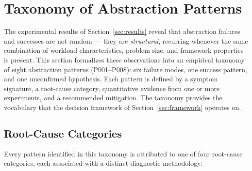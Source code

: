 
\section{Taxonomy of Abstraction Patterns}
\label{sec:taxonomy}

The experimental results of Section~\ref{sec:results} reveal that abstraction
failures and successes are not random --- they are \emph{structural}, recurring
whenever the same combination of workload characteristics, problem size, and
framework properties is present. This section formalizes these observations into
an empirical taxonomy of eight abstraction patterns (P001--P008): six failure
modes, one success pattern, and one unconfirmed hypothesis. Each pattern is
defined by a symptom signature, a root-cause category, quantitative evidence
from one or more experiments, and a recommended mitigation. The taxonomy
provides the vocabulary that the decision framework of
Section~\ref{sec:framework} operates on.

\subsection{Root-Cause Categories}
\label{subsec:categories}

Every pattern identified in this taxonomy is attributed to one of four
root-cause categories, each associated with a distinct diagnostic methodology:


